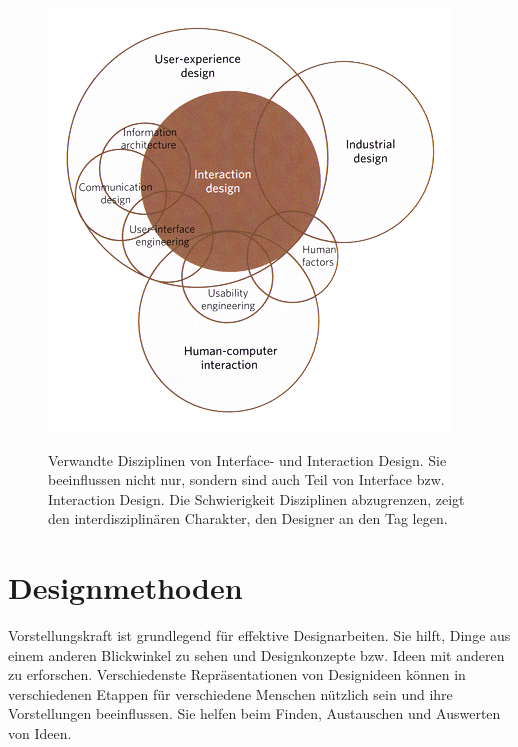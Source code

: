 \begin{figure}
	\begin{center}
        {\includegraphics[width=1\linewidth]{gfx/safferInteractionDisciplines}}
	\end{center}
		\caption[Verwandte Disziplinen von Interface- und Interaction Design \newline \citep{Saffer:2007}]{Verwandte Disziplinen von Interface- und Interaction Design. Sie beeinflussen nicht nur, sondern sind auch Teil von Interface bzw. Interaction Design. Die Schwierigkeit	Disziplinen abzugrenzen, zeigt den interdisziplinären Charakter, den Designer an den Tag legen.}\label{fig:safferInteractionDisciplines}
\end{figure}

\section{Designmethoden} \label{sec:designmethoden} 
Vorstellungskraft ist grundlegend für effektive Designarbeiten. Sie hilft, Dinge aus einem anderen Blickwinkel zu sehen und Designkonzepte bzw. Ideen mit anderen zu erforschen. Verschiedenste Repräsentationen von Designideen können in verschiedenen Etappen für verschiedene Menschen nützlich sein und ihre Vorstellungen beeinflussen. Sie helfen beim Finden, Austauschen und Auswerten von Ideen.

